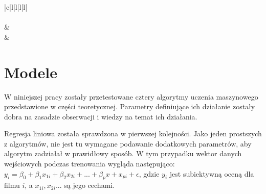 \begin{table}[!htbp]
\centering
\begin{tabular}{|c|l|l|l|l|}
\hline
{} \\ \hline
{} \\ \hline
{} &  \\ \hline
{} &  \\ \hline
\end{tabular}
\caption{Podsumowanie przygotowania danych}
\label{tab:tabela}
\end{table}



\section{Modele }
\label{cha:drugiDokument}
W niniejszej pracy zostały przetestowane cztery algorytmy uczenia maszynowego przedstawione w części teoretycznej. Parametry definiujące ich działanie zostały dobra na zasadzie obserwacji i wiedzy na temat ich działania.\par

Regresja liniowa została sprawdzona w pierwszej kolejności. Jako jeden prostszych z algorytmów, nie jest tu wymagane podawanie dodatkowych parametrów, aby algorytm zadziałał w prawidłowy sposób. W tym przypadku wektor danych wejściowych podczas trenowania wygląda następująco: $y_i = \beta_0 + \beta_1 x_{1i} + \beta_2 x_{2i} + ... + \beta_p x+x_{pi} + \epsilon $, gdzie $y_i$ jest subiektywną oceną dla filmu $i$, a $x_{1i}, x_{2i}...$ są jego cechami. \par

